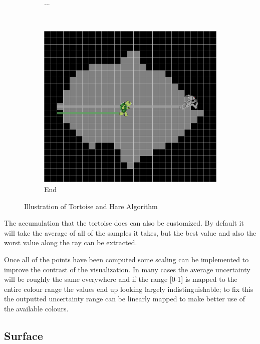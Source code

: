 \begin{figure}[H]
\begin{subfigure}[b]{0.32\textwidth}
    \caption*{...}
    \label{fig:tortoiseandhare2}
  \end{subfigure}%
  ~ %
  \begin{subfigure}[b]{0.32\textwidth}
    \includegraphics[width=\textwidth]{images/surface/tortoise_and_hare_3.png}
    \caption*{End}
    \label{fig:tortoiseandhare3}  
  \end{subfigure}
  \caption{Illustration of Tortoise and Hare Algorithm}\label{fig:tortoiseandhareexample}
\end{figure}

The accumulation that the tortoise does can also be customized. By default it will take the average of all of the samples it takes, but the best value and also the worst value along the ray can be extracted.

Once all of the points have been computed some scaling can be implemented to improve the contrast of the visualization. In many cases the average uncertainty will be roughly the same everywhere and if the range [0-1] is mapped to the entire colour range the values end up looking largely indistinguishable; to fix this the outputted uncertainty range can be linearly mapped to make better use of the available colours.

\subsection*{Surface}

